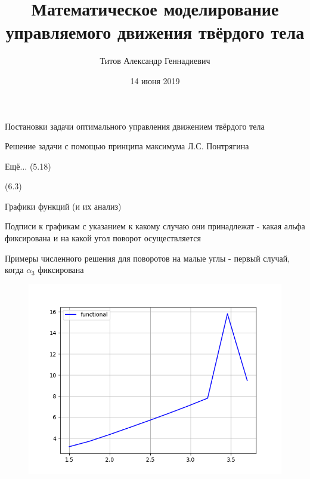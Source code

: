 \documentclass[10pt,utf8,presentation,notheorems,xcolor=dvipsnames,compress]{beamer}
\title[Мат. моделир. управления]{Математическое моделирование управляемого движения твёрдого тела}
\author[Титов А. Г.]{Титов Александр Геннадиевич}
\institute[01.03.02]{«Прикладная математика и информатика»}
\date{14 июня 2019}
\begin{document}

\begin{frame}
\titlepage
\end{frame}

\begin{frame}{Постановки задачи оптимального управления движением твёрдого тела}
\end{frame}

\begin{frame}{Решение задачи с помощью принципа максимума Л.С. Понтрягина}
\end{frame}

\begin{frame}{Ещё...}
(5.18)

(6.3)

Графики функций (и их анализ)

Подписи к графикам с указанием к какому случаю они принадлежат - какая альфа фиксирована и на какой угол поворот осуществляется
\end{frame}

\begin{frame}{Примеры численного решения для поворотов на малые углы - первый случай, когда $\alpha_3$ фиксирована}
\begin{figure}[H]
\center\includegraphics[scale=0.5]{fig/functional_1_5-3_7_50.png}
\caption{}
\end{figure}
\end{frame}
\end{document}
